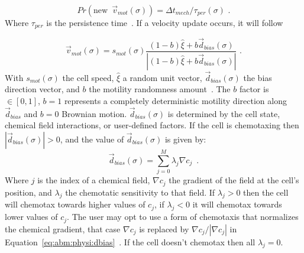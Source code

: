 \begin{equation}\label{eq:abm:physi:change-vmot}
    Pr(\text{new}\,\,\,\Vec{v}_{mot}(\sigma)) = \Delta t_{mech} / \tau_{per}(\sigma)\,\,.
\end{equation}
\noindent Where $\tau_{per}$ is the persistence time~\cite{ghaffarizadeh_physicell_2018}. If a velocity update occurs, it will follow

\begin{equation}
    \Vec{v}_{mot}(\sigma) = s_{mot}(\sigma) \frac{\left(1 - b\right) \hat{\xi} + b \Vec{d}_{bias}(\sigma)}{|\left(1 - b\right) \hat{\xi} + b \Vec{d}_{bias}(\sigma)|}\,\,.
\end{equation}
\noindent With $s_{mot}(\sigma)$ the cell speed, $\hat{\xi}$ a random unit vector, $\Vec{d}_{bias}(\sigma)$ the bias direction vector, and $b$ the motility randomness amount~\cite{ghaffarizadeh_physicell_2018}. The $b$ factor  is $\in[0, 1]$, $b=1$ represents a completely deterministic motility direction along $\Vec{d}_{bias}$ and $b=0$ Brownian motion. $\Vec{d}_{bias}(\sigma)$ is determined by the cell state, chemical field interactions, or user-defined factors. If the cell is chemotaxing then $|\Vec{d}_{bias}(\sigma)| > 0$, and the value of $\Vec{d}_{bias}(\sigma)$ is given by:
\begin{equation}\label{eq:abm:physi:dbias}
    \Vec{d}_{bias}(\sigma) = \sum_{j=0}^M \lambda_j \nabla c_j \,\,\,.%
\end{equation}
\noindent Where $j$ is the index of a chemical field, $\nabla c_j$ the gradient of the field at the cell's position, and $\lambda_j$ the chemotatic sensitivity to that field. If $\lambda_j>0$ then the cell will chemotax towards higher values of $c_j$, if $\lambda_j<0$ it will chemotax towards lower values of $c_j$. The user may opt to use a form of chemotaxis that normalizes the chemical gradient, that case $\nabla c_j $ is replaced by $\nabla c_j / |\nabla c_j |$ in Equation~\ref{eq:abm:physi:dbias}~\cite{ghaffarizadeh_physicell_2018}. If the cell doesn't chemotax then all $\lambda_j=0$.



